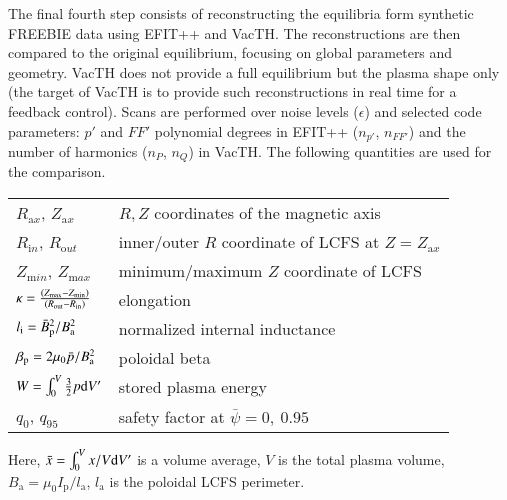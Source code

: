 The final fourth step consists of reconstructing the equilibria form synthetic FREEBIE data using EFIT++ and VacTH. The reconstructions are then compared to the original equilibrium, focusing on global parameters and geometry. VacTH does not provide a full equilibrium but the plasma shape only (the target of VacTH is to provide such reconstructions in real time for a feedback control). Scans are performed over noise levels ($\epsilon$) and selected code parameters: $p'$ and $FF'$ polynomial degrees in EFIT++ ($n_{p'}$, $n_{FF'}$) and the number of harmonics ($n_P$, $n_Q$) in VacTH. The following quantities are used for the comparison.
\begin{table}[!h]
    \begin{tabular}{ll}
    $R_{\mathrm ax}$, $Z_{\mathrm ax}$ & $R,Z$ coordinates of the magnetic axis \\
    $R_{\mathrm in}$, $R_{\mathrm out}$ & inner/outer $R$ coordinate of LCFS at $Z=Z_{\mathrm ax}$ \\
    $Z_{\mathrm min}$, $Z_{\mathrm max}$ & minimum/maximum $Z$ coordinate of LCFS \\
    $\kappa  = \frac{\left( {{Z_{{\rm{max}}}} - {Z_{{\rm{min}}}}} \right) } { \left( {{R_{{\rm{out}}}} - {R_{{\rm{in}}}}} \right) }$          & elongation   \\
    ${l_{\rm{i}}} = {{\bar B_{\rm{p}}^2}} / {{B_{\rm{a}}^2}}$          & normalized internal inductance   \\
    ${\beta _{\rm{p}}} = {{2{\mu _0}\bar p}} / {{B_{\rm{a}}^2}}$          & poloidal beta   \\
    $ W = \int_0^V {\frac{3}{2}p{\rm{d}}V'}$ & stored plasma energy \\
    $ q_0$, $q_{95}$ & safety factor at $\bar \psi = 0,\ 0.95$ \\
    \end{tabular}
\end{table}

Here, $\bar x = \int_0^V {x/V{\rm{d}}V'} $ is a volume average, $V$ is the total plasma volume, $B_{\mathrm a} = \mu _0 I_\mathrm{p} / l_{\mathrm a}$, $l_{\mathrm a}$ is the poloidal LCFS perimeter.


